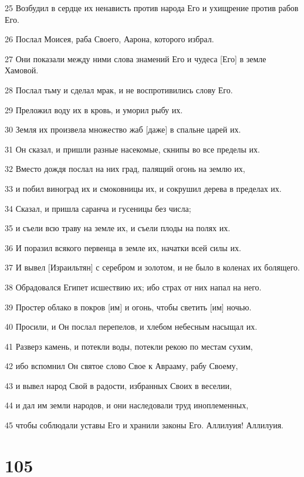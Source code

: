 \par 25 Возбудил в сердце их ненависть против народа Его и ухищрение против рабов Его.
\par 26 Послал Моисея, раба Своего, Аарона, которого избрал.
\par 27 Они показали между ними слова знамений Его и чудеса [Его] в земле Хамовой.
\par 28 Послал тьму и сделал мрак, и не воспротивились слову Его.
\par 29 Преложил воду их в кровь, и уморил рыбу их.
\par 30 Земля их произвела множество жаб [даже] в спальне царей их.
\par 31 Он сказал, и пришли разные насекомые, скнипы во все пределы их.
\par 32 Вместо дождя послал на них град, палящий огонь на землю их,
\par 33 и побил виноград их и смоковницы их, и сокрушил дерева в пределах их.
\par 34 Сказал, и пришла саранча и гусеницы без числа;
\par 35 и съели всю траву на земле их, и съели плоды на полях их.
\par 36 И поразил всякого первенца в земле их, начатки всей силы их.
\par 37 И вывел [Израильтян] с серебром и золотом, и не было в коленах их болящего.
\par 38 Обрадовался Египет исшествию их; ибо страх от них напал на него.
\par 39 Простер облако в покров [им] и огонь, чтобы светить [им] ночью.
\par 40 Просили, и Он послал перепелов, и хлебом небесным насыщал их.
\par 41 Разверз камень, и потекли воды, потекли рекою по местам сухим,
\par 42 ибо вспомнил Он святое слово Свое к Аврааму, рабу Своему,
\par 43 и вывел народ Свой в радости, избранных Своих в веселии,
\par 44 и дал им земли народов, и они наследовали труд иноплеменных,
\par 45 чтобы соблюдали уставы Его и хранили законы Его. Аллилуия! Аллилуия.

\chapter{105}

